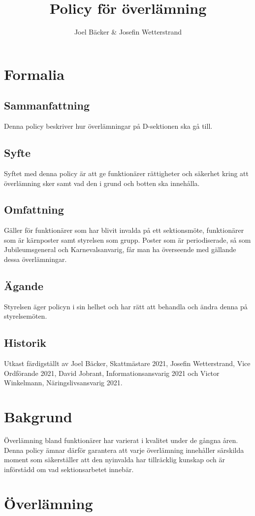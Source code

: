 \documentclass[]{dsekprotokoll}
\title{Policy för överlämning}
\author{Joel Bäcker \& Josefin Wetterstrand}
\begin{document}
\section{Formalia}
\subsection{Sammanfattning}
Denna policy beskriver hur överlämningar på D-sektionen ska gå till.

\subsection{Syfte}
Syftet med denna policy är att ge funktionärer rättigheter och säkerhet kring att överlämning sker samt vad den i grund och botten ska innehålla.

\subsection{Omfattning} %
Gäller för funktionärer som har blivit invalda på ett sektionsmöte, funktionärer som är kärnposter samt styrelsen som grupp. Poster som är periodiserade, så som Jubileumsgeneral och Karnevalsanvarig, får man ha överseende med gällande dessa överlämningar.

\subsection{Ägande}
Styrelsen äger policyn i sin helhet och har rätt att behandla och ändra denna på styrelsemöten.

\subsection{Historik}
Utkast färdigställt av Joel Bäcker, Skattmästare 2021, Josefin Wetterstrand, Vice Ordförande 2021, David Jobrant, Informationsansvarig 2021 och Victor Winkelmann, Näringslivsansvarig 2021.

\section{Bakgrund}
Överlämning bland funktionärer har varierat i kvalitet under de gångna åren. Denna policy ämnar därför garantera att varje överlämning innehåller särskilda moment som säkerställer att den nyinvalda har tillräcklig kunskap och är införstådd om vad sektionsarbetet innebär.

\section{Överlämning}
\end{document}
